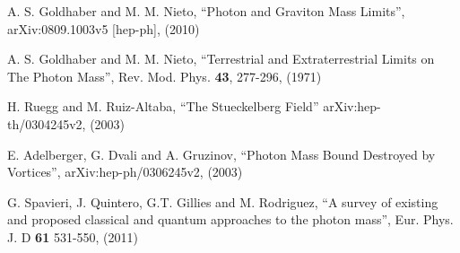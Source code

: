 \documentclass[a4paper, twocolumn, titlepage]{article}
\begin{document}
\begin{thebibliography}{9}
	A. S. Goldhaber and M. M. Nieto,
	"`Photon and Graviton Mass Limits"',
	arXiv:0809.1003v5 [hep-ph],
	(2010)

	A. S. Goldhaber and M. M. Nieto,
	"`Terrestrial and Extraterrestrial Limits on The Photon Mass"',
	Rev. Mod. Phys. {\bf 43}, 277-296,
	(1971)

	H. Ruegg and M. Ruiz-Altaba,
	"`The Stueckelberg Field"'
	arXiv:hep-th/0304245v2,
	(2003)

	E. Adelberger, G. Dvali and A. Gruzinov,
	"`Photon Mass Bound Destroyed by Vortices"',
	arXiv:hep-ph/0306245v2,
	(2003)

	G. Spavieri, J. Quintero, G.T. Gillies and M. Rodriguez,
	"`A survey of existing and proposed classical and quantum approaches to the photon mass"',
	Eur. Phys. J. D {\bf 61} 531-550,
	(2011)
\end{thebibliography}
\end{document}
